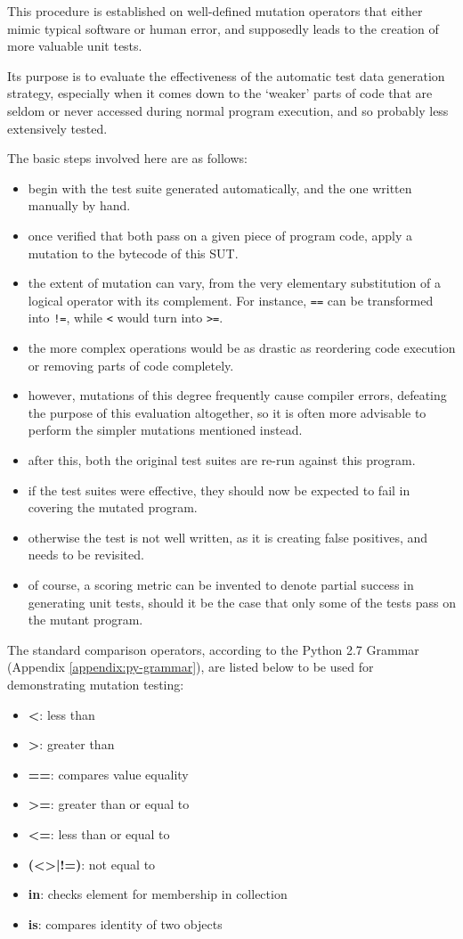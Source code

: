\documentclass{icldt}
\numberwithin{equation}{section}       %
\begin{document}
{{This procedure is established on well-defined mutation operators that either mimic typical software or human error, and supposedly leads to the creation of more valuable unit tests.

Its purpose is to evaluate the effectiveness of the automatic test data generation strategy, especially when it comes down to the `weaker' parts of code that are seldom or never accessed during normal program execution, and so probably less extensively tested.

The basic steps involved here are as follows:
\begin{itemize}
	\item begin with the test suite generated automatically, and the one written manually by hand.
	\item once verified that both pass on a given piece of program code, apply a mutation to the bytecode of this SUT.
	\item the extent of mutation can vary, from the very elementary substitution of a logical operator with its complement. For instance, \texttt{==} can be transformed into \texttt{!=}, while \texttt{<} would turn into \texttt{>=}.
	\item the more complex operations would be as drastic as reordering code execution or removing parts of code completely.
	\item however, mutations of this degree frequently cause compiler errors, defeating the purpose of this evaluation altogether, so it is often more advisable to perform the simpler mutations mentioned instead.
	\item after this, both the original test suites are re-run against this program.
	\item if the test suites were effective, they should now be expected to fail in covering the mutated program.
	\item otherwise the test is not well written, as it is creating false positives, and needs to be revisited.
	\item of course, a scoring metric can be invented to denote partial success in generating unit tests, should it be the case that only some of the tests pass on the mutant program.
\end{itemize}

The standard comparison operators, according to the Python 2.7 Grammar (Appendix \ref{appendix:py-grammar}), are listed below to be used for demonstrating mutation testing:
\begin{itemize}
	\item \textbf{<}: less than
	\item \textbf{>}: greater than
	\item \textbf{==}: compares value equality
	\item \textbf{>=}: greater than or equal to
	\item \textbf{<=}: less than or equal to
	\item \textbf{(<>|!=)}: not equal to
	\item \textbf{in}: checks element for membership in collection
	\item \textbf{is}: compares identity of two objects
\end{itemize}

}}
\end{document}
